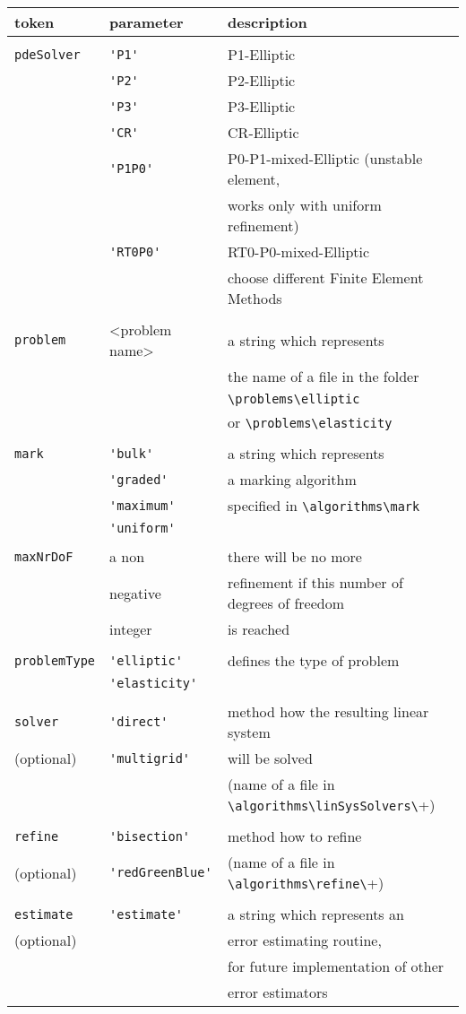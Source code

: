 \begin{longtable}[h]{lll}
token & parameter & description \\\hline\\[-1ex]

\verb+pdeSolver+
&\verb+'P1'+	&         P1-Elliptic\\
&\verb+'P2'+	&         P2-Elliptic\\
&\verb+'P3'+	&         P3-Elliptic\\
&\verb+'CR'+	&         CR-Elliptic\\
&\verb+'P1P0'+	&       P0-P1-mixed-Elliptic (unstable element,\\
    & & works only with uniform refinement)\\
&\verb+'RT0P0'+	&      RT0-P0-mixed-Elliptic\\
&		&choose different Finite Element Methods\\
\\
\verb+problem+& <problem name>
		&a string which represents \\ %
 &		&the name of a file in the folder\\
&		&\verb+\problems\elliptic+\\
&		&or \verb+\problems\elasticity+\\
\\
\verb+mark+&
 \verb+'bulk'+	&a string which represents \\
&\verb+'graded'+& a marking algorithm \\
&\verb+'maximum'+&specified in \verb+\algorithms\mark+\\
&\verb+'uniform'+&\\
\\
\verb+maxNrDoF+& a non &there will be no more \\
 &negative & refinement if this number of degrees of freedom \\
&integer &is reached\\
\\
\verb+problemType+&\verb+'elliptic'+ &defines the type of problem \\
 &\verb+'elasticity'+&\\
\\
\verb+solver+&\verb+'direct'+ &method how the resulting linear system \\
 (optional)&\verb+'multigrid'+&will be solved \\
&&(name of a file in \verb+\algorithms\linSysSolvers\+)\\
\\
\verb+refine+&\verb+'bisection'+ &method how to refine \\
 (optional)&\verb+'redGreenBlue'+&(name of a file in \verb+\algorithms\refine\+)\\
\\
\verb+estimate+&\verb+'estimate'+ &a string which represents an \\
 (optional)&&error estimating routine, \\
&& for future implementation of other\\
&& error estimators
\end{longtable}

\clearpage